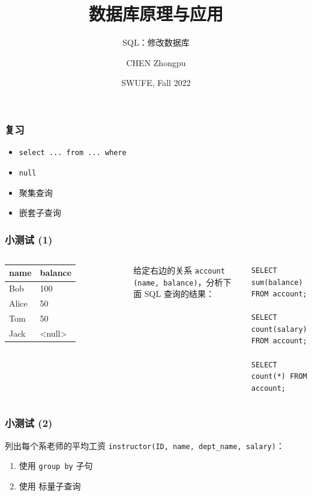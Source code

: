 \documentclass[aspectratio=169, 14pt]{beamer}
\title[Database Principles and Applications] %
{数据库原理与应用}
\subtitle{SQL：修改数据库}
\author[CHEN Zhongpu] %
{CHEN Zhongpu}
\institute[] %
{
  School of Computing and Artificial Intelligence \\
  \href{mailto:zpchen@swufe.edu.cn}{zpchen@swufe.edu.cn}
}
\date[] %
{SWUFE, Fall 2022}
\begin{document}
\frame{\titlepage}

\begin{frame}
    \frametitle{复习}
    \begin{itemize}
        \item \texttt{select ... from ... where}
        \item \texttt{null}
        \item 聚集查询
        \item 嵌套子查询
    \end{itemize}
\end{frame}

\begin{frame}[fragile]
    \frametitle{小测试 (1)}

\begin{columns}
    \begin{table}
        \begin{tabular}{ll}
          \toprule
          name & balance \\
          \midrule
          Bob & 100 \\
          Alice & 50 \\
          Tom & 50 \\
          Jack & <null> \\
          \bottomrule
        \end{tabular}
    \end{table}
    给定右边的关系 \texttt{account (name, balance)}，分析下面 SQL 查询的结果：

    \begin{verbatim} 
SELECT sum(balance) FROM account;

SELECT count(salary) FROM account;

SELECT count(*) FROM account;
    \end{verbatim}

\end{columns}
    
\end{frame}

\begin{frame}
    \frametitle{小测试 (2)}
    列出每个系老师的平均工资  \texttt{instructor(ID, name, dept\_name, salary)}：

\begin{enumerate}
    \item 使用 \texttt{group by} 子句
    \item 使用 标量子查询
\end{enumerate}

\end{frame}
\end{document}
